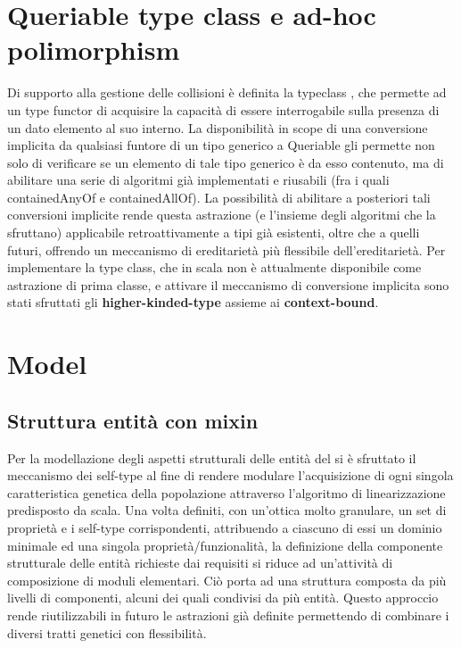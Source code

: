 \section{Queriable type class e ad-hoc polimorphism}
Di supporto alla gestione delle collisioni è definita la typeclass , che permette ad un type functor di acquisire la capacità di essere interrogabile sulla presenza di un dato elemento al suo interno. La disponibilità in scope di una conversione implicita da qualsiasi funtore di un tipo generico a Queriable gli permette non solo di verificare se un elemento di tale tipo generico è da esso contenuto, ma di abilitare una serie di algoritmi già implementati e riusabili (fra i quali containedAnyOf e containedAllOf). La possibilità di abilitare a posteriori tali conversioni implicite rende questa astrazione (e l’insieme degli algoritmi che la sfruttano) applicabile retroattivamente a tipi già esistenti, oltre che a quelli futuri, offrendo un meccanismo di ereditarietà più flessibile dell’ereditarietà. Per implementare la type class, che in scala non è attualmente disponibile come astrazione di prima classe, e attivare il meccanismo di conversione implicita sono stati sfruttati gli \textbf{higher-kinded-type} assieme ai \textbf{context-bound}.

\section{Model}

\subsection{Struttura entità con mixin}
Per la modellazione degli aspetti strutturali delle entità del  si è sfruttato il meccanismo dei self-type al fine di rendere modulare l’acquisizione di ogni singola caratteristica genetica della popolazione attraverso l’algoritmo di linearizzazione predisposto da scala. Una volta definiti, con un’ottica molto granulare, un set di proprietà e i self-type corrispondenti, attribuendo a ciascuno di essi un dominio minimale ed una singola proprietà/funzionalità, la definizione della componente strutturale delle entità richieste dai requisiti si riduce ad un’attività di composizione di moduli elementari. Ciò porta ad una struttura composta da più livelli di componenti, alcuni dei quali condivisi da più entità. Questo approccio rende riutilizzabili in futuro le astrazioni già definite permettendo di combinare i diversi tratti genetici con flessibilità.

